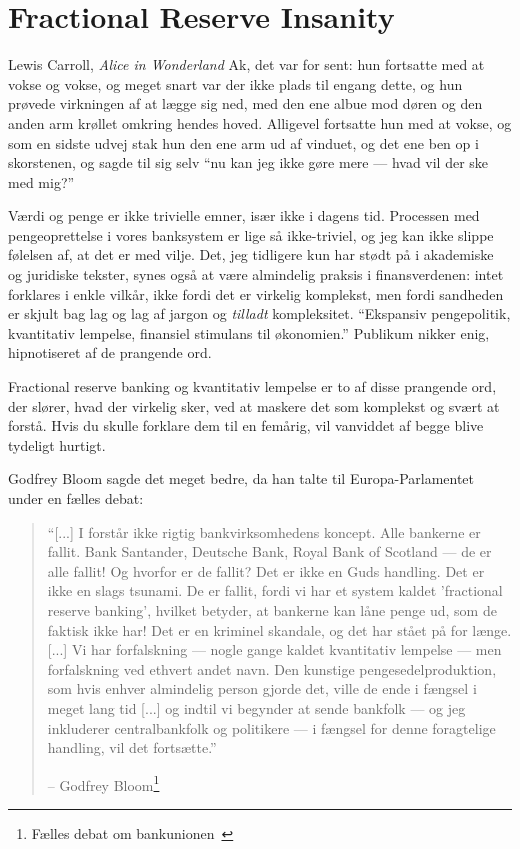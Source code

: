 \chapter{Fractional Reserve Insanity}
\label{les:13}

\begin{chapquote}{Lewis Carroll, \textit{Alice in Wonderland}}
Ak, det var for sent: hun fortsatte med at vokse og vokse, og meget snart var 
der ikke plads til engang dette, og hun prøvede virkningen af at lægge sig 
ned, med den ene albue mod døren og den anden arm krøllet omkring hendes hoved. 
Alligevel fortsatte hun med at vokse, og som en sidste udvej stak hun den ene 
arm ud af vinduet, og det ene ben op i skorstenen, og sagde til sig selv
\enquote{nu kan jeg ikke gøre mere — hvad vil der ske med mig?}
\end{chapquote}

Værdi og penge er ikke trivielle emner, især ikke i dagens tid. Processen med 
pengeoprettelse i vores banksystem er lige så ikke-triviel, og jeg kan ikke 
slippe følelsen af, at det er med vilje. Det, jeg tidligere kun har stødt på 
i akademiske og juridiske tekster, synes også at være almindelig praksis i 
finansverdenen: intet forklares i enkle vilkår, ikke fordi det er virkelig 
komplekst, men fordi sandheden er skjult bag lag og lag af jargon og 
\textit{tilladt} kompleksitet. \enquote{Ekspansiv pengepolitik, kvantitativ 
lempelse, finansiel stimulans til økonomien.} Publikum nikker enig,
hipnotiseret af de prangende ord.

Fractional reserve banking og kvantitativ lempelse er to af disse prangende ord,
der slører, hvad der virkelig sker, ved at maskere det som komplekst og 
svært at forstå. Hvis du skulle forklare dem til en femårig, vil vanviddet af 
begge blive tydeligt hurtigt.

Godfrey Bloom sagde det meget bedre, da han talte til Europa-Parlamentet 
under en fælles debat:

\begin{quotation}\begin{samepage}
\enquote{[...] I forstår ikke rigtig bankvirksomhedens koncept. Alle
bankerne er fallit. Bank Santander, Deutsche Bank, Royal Bank of
Scotland --- de er alle fallit! Og hvorfor er de fallit? Det er ikke en
Guds handling. Det er ikke en slags tsunami. De er fallit, fordi vi
har et system kaldet 'fractional reserve banking', hvilket betyder, at
bankerne kan låne penge ud, som de faktisk ikke har! Det er en kriminel
skandale, og det har stået på for længe. [...]
Vi har forfalskning --- nogle gange kaldet kvantitativ lempelse ---
men forfalskning ved ethvert andet navn. Den kunstige
pengesedelproduktion, som hvis enhver almindelig person gjorde det, ville de 
ende i fængsel i meget lang tid [...] og indtil vi begynder at sende
bankfolk --- og jeg inkluderer centralbankfolk og politikere --- i
fængsel for denne foragtelige handling, vil det fortsætte.}
\begin{flushright} -- Godfrey Bloom\footnote{Fælles debat om
bankunionen~\cite{godfrey-bloom}}
\end{flushright}\end{samepage}\end{quotation}

